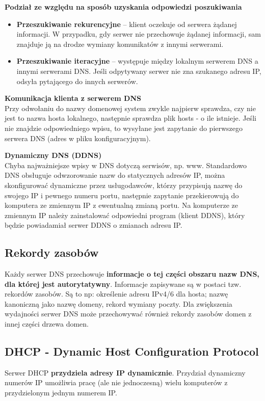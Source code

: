 \documentclass[../main.tex]{subfiles}
\begin{document}
    \textbf{Podział ze względu na sposób uzyskania odpowiedzi poszukiwania}
    \begin{itemize}
        \item \textbf{Przeszukiwanie rekurencyjne} – klient oczekuje od serwera żądanej informacji. W przypadku,
        gdy serwer nie przechowuje żądanej informacji, sam znajduje ją na drodze wymiany
        komunikatów z innymi serwerami.
        \item \textbf{Przeszukiwanie iteracyjne} – występuje między lokalnym serwerem DNS a innymi serwerami
        DNS. Jeśli odpytywany serwer nie zna szukanego adresu IP, odsyła pytającego do innych
        serwerów.
    \end{itemize}

    \textbf{Komunikacja klienta z serwerem DNS}\\
    Przy odwołaniu do nazwy domenowej system zwykle najpierw sprawdza, czy nie jest to
    nazwa hosta lokalnego, następnie sprawdza plik hosts - o ile istnieje. Jeśli nie znajdzie odpowiedniego wpisu, to
    wysyłane jest zapytanie do pierwszego serwera DNS (adres w pliku
    konfiguracyjnym).

    \textbf{Dynamiczny DNS (DDNS)}\\
    Chyba najważniejsze wpisy w DNS dotyczą serwisów, np. www. Standardowo DNS obsługuje
    odwzorowanie nazw do statycznych adresów IP, można skonfigurować dynamiczne przez usługodawców,
    którzy przypisują nazwę do swojego IP i pewnego numeru portu, następnie zapytanie
    przekierowują do komputera ze zmiennym IP z ewentualną zmianą portu. Na komputerze ze zmiennym IP należy
    zainstalować odpowiedni program (klient DDNS), który będzie powiadamiał serwer DDNS o
    zmianach adresu IP.

    \subsection{Rekordy zasobów}
    Każdy serwer DNS przechowuje \textbf{informacje o tej części obszaru nazw DNS, dla której jest
    autorytatywny}. Informacje
    zapisywane są w postaci tzw. rekordów zasobów. Są to np: określenie adresu IPv4/6 dla hosta; nazwę kanoniczną jako nazwę domeny,
    rekord wymiany poczty.
    Dla zwiększenia wydajności serwer DNS może przechowywać również rekordy zasobów
    domen z innej części drzewa domen.

    \subsection{DHCP - Dynamic Host Configuration Protocol}
    Serwer DHCP \textbf{przydziela adresy IP dynamicznie}.
    Przydział dynamiczny numerów IP umożliwia pracę (ale nie jednoczesną) wielu komputerów z
    przydzielonym jednym numerem IP.
\end{document}
